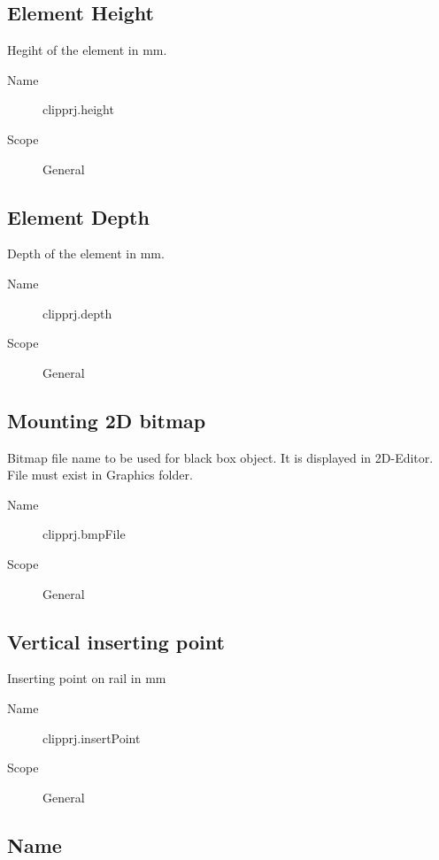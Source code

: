 \documentclass[%
	a4paper,
	oneside,
	listof=numbered,
	parskip=half,
	headsepline=true,
	footsepline=false,
	0.7headlines,
	]{scrbook}
\begin{document}
\subsection{Element Height}

Hegiht of the element in mm.

\begin{description}
	\item[Name] clipprj.height
	\item[Scope] General
\end{description}

\subsection{Element Depth}

Depth of the element in mm.

\begin{description}
	\item[Name] clipprj.depth
	\item[Scope] General
\end{description}

\subsection{Mounting 2D bitmap}

Bitmap file name to be used for black box object.
It is displayed in 2D-Editor.
File must exist in Graphics folder.

\begin{description}
	\item[Name] clipprj.bmpFile
	\item[Scope] General
\end{description}

\subsection{Vertical inserting point}

Inserting point on rail in mm

\begin{description}
	\item[Name] clipprj.insertPoint
	\item[Scope] General
\end{description}

\subsection{Name}
\end{document}
